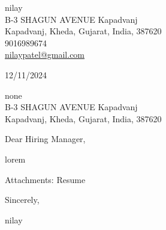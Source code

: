 \documentclass[11pt,a4paper]{article}
\begin{document}
\thispagestyle{empty}

\begin{flushleft}
nilay\\
B-3 SHAGUN AVENUE Kapadvanj\\
Kapadvanj, Kheda, Gujarat, India, 387620\\
9016989674\\
\href{mailto:nilaypatel@gmail.com}{nilaypatel@gmail.com}
\end{flushleft}

\begin{flushright}
12/11/2024
\end{flushright}

\vspace{0.5cm}
none\\
B-3 SHAGUN AVENUE Kapadvanj\\
Kapadvanj, Kheda, Gujarat, India, 387620

\vspace{0.5cm}
\noindent Dear Hiring Manager,

\vspace{0.3cm}
lorem

\vspace{0.5cm}
\noindent Attachments: Resume

\vspace{0.5cm}
\noindent Sincerely,

\vspace{1cm}
\noindent nilay
\end{document}
